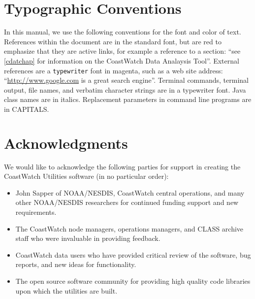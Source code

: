\section*{Typographic Conventions}

In this manual, we use the following conventions for the font and
color of text.  References within the document are in the
standard font, but are red to emphasize that they are active
links, for example a reference to a section: ``see
\autoref{cdatchap} for information on the CoastWatch Data
Analaysis Tool''.  External references are a {\tt typewriter}
font in magenta, such as a web site address:
``\url{http://www.google.com} is a great search engine''.
Terminal commands, terminal output, file names, and verbatim
character strings are in a {\file typewriter} font.  Java class
names are in {\java italics}.  Replacement parameters in command
line programs are in CAPITALS.

\section*{Acknowledgments}

We would like to acknowledge the following parties for support in
creating the CoastWatch Utilities software (in no particular
order):
\begin{itemize}

  \item John Sapper of NOAA/NESDIS, CoastWatch central
  operations, and many other NOAA/NESDIS researchers for
  continued funding support and new requirements.

  \item The CoastWatch node managers, operations managers, and
  CLASS archive staff who were invaluable in providing feedback.

  \item CoastWatch data users who have provided critical review
  of the software, bug reports, and new ideas for functionality.

  \item The open source software community for providing high
  quality code libraries upon which the utilities are built.

\end{itemize}
